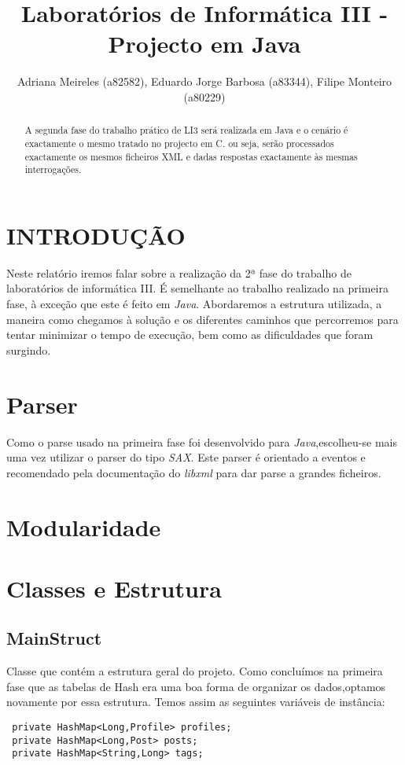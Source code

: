\documentclass[letterpaper, 10 pt, conference]{IEEEtran}  %
\title{\LARGE \bf
Laboratórios de Informática III - Projecto em Java
}
\author{Adriana Meireles (a82582), Eduardo Jorge Barbosa (a83344), Filipe Monteiro (a80229)%
}
\begin{document}
\maketitle
\thispagestyle{empty}
\pagestyle{empty}


\begin{abstract}

A segunda fase do trabalho prático de LI3 será realizada em Java e o cenário é exactamente o mesmo tratado no projecto em C. ou seja, serão processados exactamente os mesmos ficheiros XML e dadas respostas exactamente às mesmas interrogações.

\end{abstract}


\section{INTRODUÇÃO}

Neste relatório iremos falar sobre a realização da 2ª fase do trabalho de laboratórios de informática III.
É semelhante ao trabalho realizado na primeira fase, à exceção que este é feito em \textit{Java}.
Abordaremos a estrutura utilizada, a maneira como chegamos à solução e os diferentes caminhos que percorremos para tentar minimizar o tempo de execução, bem como as dificuldades que foram surgindo.

\section{Parser}

Como o parse usado na primeira fase foi desenvolvido para \textit{Java},escolheu-se mais uma vez utilizar o parser do tipo \textit{SAX}. Este parser é orientado a eventos e recomendado pela documentação do \textit{libxml} para dar parse a grandes ficheiros.

\section{Modularidade}

\section{Classes e Estrutura}

\subsection{MainStruct}
Classe que contém a estrutura geral do projeto. Como concluímos na primeira fase que as tabelas de Hash era uma boa forma de organizar os dados,optamos novamente por essa estrutura.
\newline
Temos assim as seguintes variáveis de instância:
\begin{lstlisting}
 private HashMap<Long,Profile> profiles;
 private HashMap<Long,Post> posts;
 private HashMap<String,Long> tags;
 \end{lstlisting}
\end{document}
